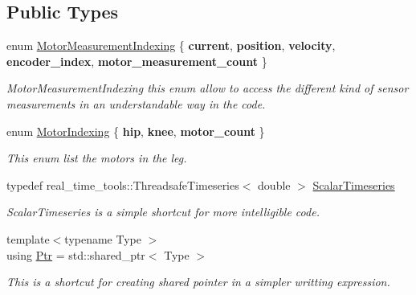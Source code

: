 \subsection*{Public Types}
\begin{DoxyCompactItemize}
\item 
\mbox{\label{classblmc__drivers_1_1LegInterface_a9335cf8bf2595f70716159927d927346}} 
enum \hyperlink{classblmc__drivers_1_1LegInterface_a9335cf8bf2595f70716159927d927346}{Motor\+Measurement\+Indexing} \{ \newline
{\bfseries current}, 
{\bfseries position}, 
{\bfseries velocity}, 
{\bfseries encoder\+\_\+index}, 
\newline
{\bfseries motor\+\_\+measurement\+\_\+count}
 \}\begin{DoxyCompactList}\small\item\em Motor\+Measurement\+Indexing this enum allow to access the different kind of sensor measurements in an understandable way in the code. \end{DoxyCompactList}
\item 
\mbox{\label{classblmc__drivers_1_1LegInterface_a2a11567617debfdb731ac06e2938712c}} 
enum \hyperlink{classblmc__drivers_1_1LegInterface_a2a11567617debfdb731ac06e2938712c}{Motor\+Indexing} \{ {\bfseries hip}, 
{\bfseries knee}, 
{\bfseries motor\+\_\+count}
 \}\begin{DoxyCompactList}\small\item\em This enum list the motors in the leg. \end{DoxyCompactList}
\item 
\mbox{\label{classblmc__drivers_1_1LegInterface_a57a35b64a76fb4225637828d1b1c35a6}} 
typedef real\+\_\+time\+\_\+tools\+::\+Threadsafe\+Timeseries$<$ double $>$ \hyperlink{classblmc__drivers_1_1LegInterface_a57a35b64a76fb4225637828d1b1c35a6}{Scalar\+Timeseries}
\begin{DoxyCompactList}\small\item\em Scalar\+Timeseries is a simple shortcut for more intelligible code. \end{DoxyCompactList}\item 
{\footnotesize template$<$typename Type $>$ }\\using \hyperlink{classblmc__drivers_1_1LegInterface_ac5af9e6514abff5ee918813925a8e42d}{Ptr} = std\+::shared\+\_\+ptr$<$ Type $>$
\begin{DoxyCompactList}\small\item\em This is a shortcut for creating shared pointer in a simpler writting expression. \end{DoxyCompactList}\end{DoxyCompactItemize}

